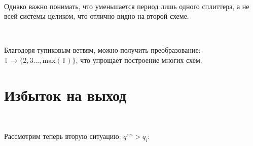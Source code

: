 \

Однако важно понимать, что уменьшается период лишь одного сплиттера, а не всей системы целиком, что отлично видно на второй схеме.

\

Благодоря тупиковым ветвям, можно получить преобразование: $\mathbb{T} \to \{ 2, 3 \ldots, \text{max}(\mathbb{T}) \}$, что упрощает построение многих схем.









\vspace{0.25in}
\section{Избыток на выход}

\







\noindent Рассмотрим теперь вторую ситуацию: $q^{\text{res}} > q_i$:

\vspace{0.5in}

